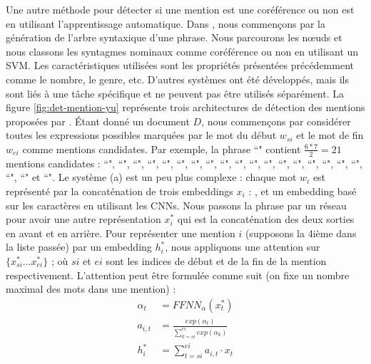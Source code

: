 \documentclass{KodeBook}
\begin{document}
Une autre méthode pour détecter si une mention est une coréférence ou non est en utilisant l'apprentissage automatique. 
Dans \cite{2013-uryupina-moschitti}, nous commençons par la génération de l'arbre syntaxique d'une phrase. 
Nous parcourons les nœuds et nous classons les syntagmes nominaux comme coréférence ou non en utilisant un SVM. 
Les caractéristiques utilisées sont les propriétés présentées précédemment comme le nombre, le genre, etc.
D'autres systèmes ont été développés, mais ils sont liés à une tâche spécifique et ne peuvent pas être utilisés séparément. 
La figure \ref{fig:det-mention-yu} représente trois architectures de détection des mentions proposées par \citet{2020-yu-al}. 
Étant donné un document $D$, nous commençons par considérer toutes les expressions possibles marquées par le mot du début $w_{si}$ et le mot de fin $w_{ei}$ comme mentions candidates. 
Par exemple, la phrase ``" contient $\frac{6 * 7}{2} = 21$ mentions candidates : ``", ``", ``", ``", ``", ``", ``", ``", ``", ``", ``", ``", ``", ``", ``",
``", ``", ``", ``", ``" et ``".
Le système (a) est un peu plus complexe : chaque mot $w_i$ est représenté par la concaténation de trois embeddings $x_i$  : ,  et un embedding basé sur les caractères en utilisant les CNNs. 
Nous passons la phrase par un réseau  pour avoir une autre représentation $x_i^*$ qui est la concaténation des deux sorties en avant et en arrière.
Pour représenter une mention $i$ (supposons la 4ième dans la liste passée) par un embedding $h^*_i$, nous appliquons une attention sur $\{x^*_{si}\ldots x^*_{ei}\}$ ; où $si$ et $ei$ sont les indices de début et de la fin de la mention respectivement.
L'attention peut être formulée comme suit (on fixe un nombre maximal des mots dans une mention) :
\begin{align*}
\alpha_t & = FFNN_\alpha(x_t^*) \\
a_{i, t} & = \frac{exp(\alpha_t)}{\sum_{k=si}^{ei} exp(\alpha_k)} \\
h_i^* & = \sum_{t=si}^{ei} a_{i, t} \cdot x_t \\
\end{align*}
\end{document}
